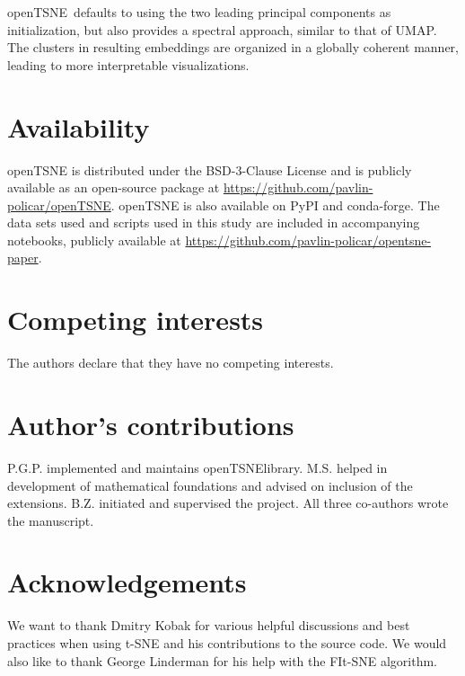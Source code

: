 \documentclass[twocolumn]{bmcart}
\newcommand{\opentsne}{\textsf{openTSNE}}
\begin{document}
\opentsne\ defaults to using the two leading principal components as
initialization, but also provides a spectral approach, similar to that of UMAP.
The clusters in resulting embeddings are organized in a globally coherent
manner, leading to more interpretable visualizations.

\section*{Availability}

openTSNE is distributed under the BSD-3-Clause License and is publicly
available as an open-source package at
\url{https://github.com/pavlin-policar/openTSNE}. openTSNE is also available on
PyPI and conda-forge. The data sets used and scripts used in this study are
included in accompanying notebooks, publicly available at
\url{https://github.com/pavlin-policar/opentsne-paper}.

\begin{backmatter}

\section*{Competing interests}
The authors declare that they have no competing interests.

\section*{Author's contributions}
P.G.P. implemented and maintains \opentsne library. M.S. helped in development of mathematical foundations and advised on inclusion of the extensions. B.Z. initiated and supervised the project. All three co-authors wrote the manuscript.

\section*{Acknowledgements}
We want to thank Dmitry Kobak for various helpful discussions and best practices when using t-SNE and his contributions to the source code. We would also like to thank George Linderman for his help with the FIt-SNE algorithm.


\end{backmatter}
\end{document}
